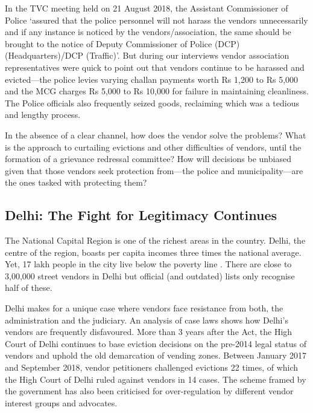 \documentclass[a4paper, 12pt, twoside]{article}
\begin{document}
{{In the TVC meeting held on 21 August 2018, the Assistant Commissioner of Police `assured that the police personnel will not harass the vendors unnecessarily and if any instance is noticed by the vendors/association, the same should be brought to the notice of Deputy Commissioner of Police (DCP) (Headquarters)/DCP (Traffic)'. But during our interviews vendor association representatives were quick to point out that vendors continue to be harassed and evicted—the police levies varying challan payments worth Rs 1,200 to Rs 5,000 and the MCG charges Rs 5,000 to Rs 10,000 for failure in maintaining cleanliness. The Police officials also frequently seized goods, reclaiming which was a tedious and lengthy process.

In the absence of a clear channel, how does the vendor solve the problems? What is the approach to curtailing evictions and other difficulties of vendors, until the formation of a grievance redressal committee? How will decisions be unbiased given that those vendors seek protection from—the police and municipality—are the ones tasked with protecting them?

\subsection*{Delhi: The Fight for Legitimacy Continues}


The National Capital Region is one of the richest areas in the country. Delhi, the centre of the region, boasts per capita incomes three times the national average. Yet, 17 lakh people in the city live below the poverty line \parencite{delhireport}. There are close to 3,00,000 street vendors in Delhi \parencite{sewapaper} but official (and outdated) lists only recognise half of these. 

Delhi makes for a unique case where vendors face resistance from both, the administration and the judiciary. An analysis of case laws shows how Delhi’s vendors are frequently disfavoured. More than 3 years after the Act, the High Court of Delhi continues to base eviction decisions on the pre-2014 legal status of vendors and uphold the old demarcation of vending zones. Between January 2017 and September 2018, vendor petitioners challenged evictions 22 times, of which the High Court of Delhi ruled against vendors in 14 cases. The scheme framed by the government has also been criticised for over-regulation by different vendor interest groups and advocates. 

}}
\end{document}
